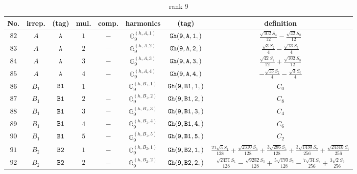\documentclass[fleqn,8pt]{jsarticle}
\begin{document}
\begin{table}[ht!]
\begin{center}
\caption{rank 9}
\renewcommand{\arraystretch}{1.3}
\begin{tabular}{cccccccc} \hline \hline
No. & irrep. & (tag) & mul. & comp. & harmonics & (tag) & definition \\ \hline
$ 82 $ & $ A $ & $ {\tt A} $ & $ 1 $ & $ - $ & $ \mathbb{G}_{9}^{(h,A,1)} $ & $ {\tt Gh(9,A,1,)} $ & $ \frac{\sqrt{102} S_{4}}{12} - \frac{\sqrt{42} S_{8}}{12} $ \\
$ 83 $ & $ A $ & $ {\tt A} $ & $ 2 $ & $ - $ & $ \mathbb{G}_{9}^{(h,A,2)} $ & $ {\tt Gh(9,A,2,)} $ & $ \frac{\sqrt{3} S_{2}}{4} - \frac{\sqrt{13} S_{6}}{4} $ \\
$ 84 $ & $ A $ & $ {\tt A} $ & $ 3 $ & $ - $ & $ \mathbb{G}_{9}^{(h,A,3)} $ & $ {\tt Gh(9,A,3,)} $ & $ \frac{\sqrt{42} S_{4}}{12} + \frac{\sqrt{102} S_{8}}{12} $ \\
$ 85 $ & $ A $ & $ {\tt A} $ & $ 4 $ & $ - $ & $ \mathbb{G}_{9}^{(h,A,4)} $ & $ {\tt Gh(9,A,4,)} $ & $ - \frac{\sqrt{13} S_{2}}{4} - \frac{\sqrt{3} S_{6}}{4} $ \\
$ 86 $ & $ B_{1} $ & $ {\tt B1} $ & $ 1 $ & $ - $ & $ \mathbb{G}_{9}^{(h,B_{1},1)} $ & $ {\tt Gh(9,B1,1,)} $ & $ C_{0} $ \\
$ 87 $ & $ B_{1} $ & $ {\tt B1} $ & $ 2 $ & $ - $ & $ \mathbb{G}_{9}^{(h,B_{1},2)} $ & $ {\tt Gh(9,B1,2,)} $ & $ C_{8} $ \\
$ 88 $ & $ B_{1} $ & $ {\tt B1} $ & $ 3 $ & $ - $ & $ \mathbb{G}_{9}^{(h,B_{1},3)} $ & $ {\tt Gh(9,B1,3,)} $ & $ C_{4} $ \\
$ 89 $ & $ B_{1} $ & $ {\tt B1} $ & $ 4 $ & $ - $ & $ \mathbb{G}_{9}^{(h,B_{1},4)} $ & $ {\tt Gh(9,B1,4,)} $ & $ C_{6} $ \\
$ 90 $ & $ B_{1} $ & $ {\tt B1} $ & $ 5 $ & $ - $ & $ \mathbb{G}_{9}^{(h,B_{1},5)} $ & $ {\tt Gh(9,B1,5,)} $ & $ C_{2} $ \\
$ 91 $ & $ B_{2} $ & $ {\tt B2} $ & $ 1 $ & $ - $ & $ \mathbb{G}_{9}^{(h,B_{2},1)} $ & $ {\tt Gh(9,B2,1,)} $ & $ \frac{21 \sqrt{5} S_{1}}{128} + \frac{\sqrt{2310} S_{3}}{128} + \frac{3 \sqrt{286} S_{5}}{128} + \frac{3 \sqrt{1430} S_{7}}{256} + \frac{\sqrt{24310} S_{9}}{256} $ \\
$ 92 $ & $ B_{2} $ & $ {\tt B2} $ & $ 2 $ & $ - $ & $ \mathbb{G}_{9}^{(h,B_{2},2)} $ & $ {\tt Gh(9,B2,2,)} $ & $ \frac{\sqrt{2431} S_{1}}{128} - \frac{\sqrt{9282} S_{3}}{128} + \frac{5 \sqrt{170} S_{5}}{128} - \frac{7 \sqrt{34} S_{7}}{256} + \frac{3 \sqrt{2} S_{9}}{256} $ \\

\end{tabular}
\end{center}
\end{table}
\end{document}
